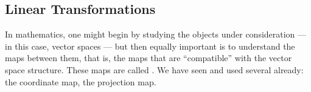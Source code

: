 % 
%
%

\begin{partbacktext}
\part{Linear Transformations}
\noindent In mathematics, one might begin by studying the objects under consideration --- in this case, vector spaces --- but then equally important is to understand the maps between them, that is, the maps that are ``compatible'' with the vector space structure.  These maps are called .  We have seen and used several already: the coordinate map, the projection map.

\end{partbacktext}
